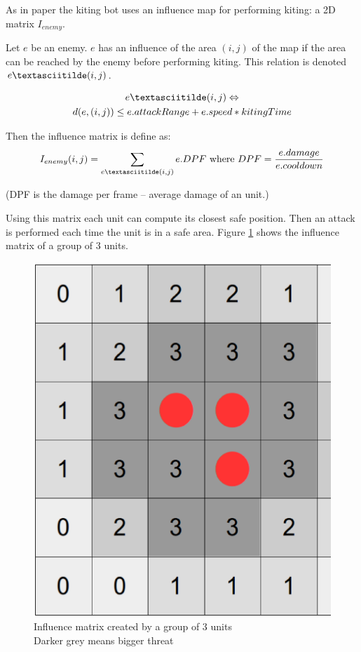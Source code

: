 As in paper \cite{kiting} the kiting bot uses an influence map for performing kiting: a 2D matrix $I_{enemy}$.

Let $e$ be an enemy. $e$ has an influence of the area $(i,j)$ of the map if the area can be reached by the enemy before performing kiting.
This relation is denoted $e \textasciitilde (i,j)$.

\begin{multline*}
    e \textasciitilde (i,j) \Leftrightarrow \\ d(e,(i,j)) \leq e.attackRange + e.speed * kitingTime
\end{multline*}

Then the influence matrix is define as:
$$
I_{enemy}(i,j) = \sum_{e \textasciitilde (i,j)}e.DPF \text{ where } DPF = \frac{e.damage}{e.cooldown}  
$$

(DPF is the damage per frame --  average damage of an unit.)

Using this matrix each unit can compute its closest safe position.
Then an attack is performed each time the unit is in a safe area.
Figure \ref{influenceMatrix} shows the influence matrix of a group of 3 units.

\begin{center}
    \begin{figure}[h!t]
        \centering
        \includegraphics[width=0.4\columnwidth]{fig/InfluenceMap.ps}
        \caption{Influence matrix created by a group of 3 units \\ 
        Darker grey means bigger threat}
        \label{influenceMatrix}
    \end{figure}
\end{center}

